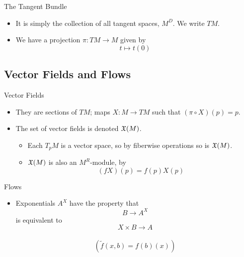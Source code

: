 \documentclass{beamer}
\begin{document}
\begin{frame}{The Tangent Bundle}
  \begin{itemize}
    \item It is simply the collection of all tangent spaces, \( M^D \). We write \( TM \).
    \item We have a projection \( \pi:TM\to M \) given by
      \begin{equation*}
        t\mapsto t(0)
      \end{equation*}
  \end{itemize}
\end{frame}

\subsection{Vector Fields and Flows}

\begin{frame}{Vector Fields}
  \begin{itemize}
    \item They are sections of \( TM \); maps \( X:M\to TM \) such that \( (\pi\circ X)(p) = p \).
    \item The set of vector fields is denoted \( \mathfrak X(M) \).
      \begin{itemize}
        \pause
        \item Each \( T_pM \) is a vector space, so by fiberwise operations so is \( \mathfrak X(M) \).
        \pause
        \item \( \mathfrak X(M) \) is also an \( M^R \)-module, by
          \begin{equation*}
            (fX)(p) = f(p)X(p)
          \end{equation*}
      \end{itemize}
  \end{itemize}
\end{frame}

\begin{frame}{Flows}
  \begin{itemize}
    \item Exponentials \( A^X \) have the property that
      \begin{equation*}
        B\to A^X 
      \end{equation*}
      is equivalent to
      \begin{equation*}
        X\times B \to A
      \end{equation*}\\
      \begin{equation*}
        \left( \tilde f(x,b) = f(b)(x) \right)
      \end{equation*}
  \end{itemize}
\end{frame}
\end{document}
